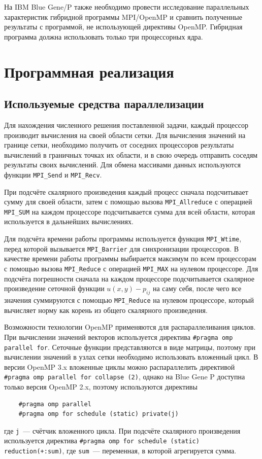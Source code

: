\documentclass[11pt]{article}
\numberwithin{equation}{section}
\theoremstyle{plain}
\theoremstyle{definition}
\begin{document}
На IBM Blue Gene/P также необходимо провести исследование параллельных
характеристик гибридной программы MPI/OpenMP и сравнить полученные результаты с
программой, не использующей директивы OpenMP. Гибридная программа должна
использовать только три процессорных ядра.

\section{Программная реализация}
\subsection{Используемые средства параллелизации}
Для нахождения численного решения поставленной задачи, каждый процессор
производит вычисления на своей области сетки. Для вычисления значений на
границе сетки, необходимо получить от соседних процессоров результаты вычислений
в граничных точках их области, и в свою очередь отправить соседям результаты
своих вычислений. Для обмена массивами данных используются функции
\verb|MPI_Send| и \verb|MPI_Recv|.

При подсчёте скалярного произведения каждый процесс сначала подсчитывает сумму
для своей области, затем с помощью вызова \verb|MPI_Allreduce| с операцией
\verb|MPI_SUM| на каждом процессоре подсчитывается сумма для всей области,
которая используется в дальнейших вычислениях.

Для подсчёта времени работы программы используется функция \verb|MPI_Wtime|,
перед которой вызывается \verb|MPI_Barrier| для синхронизации процессоров.
В качестве времени работы программы выбирается максимум по всем процессорам
с помощью вызова \verb|MPI_Reduce| с операцией \verb|MPI_MAX| на нулевом
процессоре. Для подсчёта погрешности сначала на каждом процессоре
подсчитывается скалярное произведение сеточной функции $u(x, y)-p_{ij}$ на
саму себя, после чего все значения суммируются с помощью \verb|MPI_Reduce|
на нулевом процессоре, который вычисляет норму как корень из общего скалярного
произведения.

Возможности технологии OpenMP применяются для распараллеливания циклов.
При вычислении значений векторов используется директива
\verb|#pragma omp parallel for|. Сеточные функции представляются в виде
матрицы, поэтому при вычислении значений в узлах сетки необходимо использовать
вложенный цикл. В версии OpenMP 3.x вложенные циклы можно распараллелить
директивой \verb|#pragma omp parallel for collapse (2)|, однако на Blue Gene P
доступна только версия OpenMP 2.x, поэтому используются директивы
\begin{verbatim}
    #pragma omp parallel
    #pragma omp for schedule (static) private(j)
\end{verbatim}
где \verb|j|~--- счётчик вложенного цикла.
При подсчёте скалярного произведения используется директива
\verb|#pragma omp for schedule (static) reduction(+:sum)|,
где \verb|sum|~--- переменная, в которой агрегируется сумма.
\end{document}

